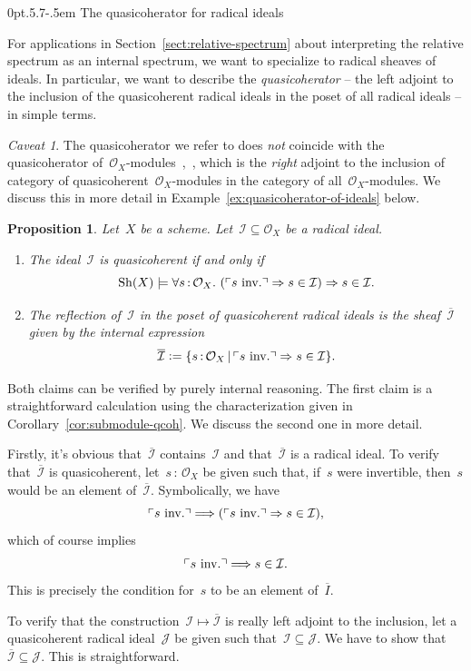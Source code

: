 \documentclass[10pt,reqno,a4paper]{amsbook}
\makeatletter
\theoremstyle{definition}
\theoremstyle{plain}
\newtheorem{prop}[defn]{Proposition}
\theoremstyle{remark}
\newtheorem{caveat}[defn]{Caveat}
\renewcommand{\O}{\mathcal{O}}
\newcommand{\I}{\mathcal{I}}
\newcommand{\J}{\mathcal{J}}
\newcommand{\Sh}{\mathrm{Sh}}
\newcommand{\?}{\,{:}\,}
\renewcommand{\_}{\mathpunct{.}\,}
\newcommand{\speak}[1]{\ulcorner\text{\textnormal{#1}}\urcorner}
\newcommand{\inv}{inv.\@}
\newcommand{\stacksproject}[1]{\cite[{\href{https://stacks.math.columbia.edu/tag/#1}{Tag~#1}}]{stacks-project}}
\newcommand{\defeq}{\vcentcolon=}
\renewenvironment{proof}[1][\proofname]{\par
  \pushQED{\qed}%
  \normalfont \topsep6\p@\@plus6\p@\relax
  \trivlist
  \item[\hskip\labelsep
        \itshape
    #1\@addpunct{.}]\ignorespaces
}{%
  \popQED\endtrivlist\@endpefalse
}
\def\subsection{\@startsection{subsection}{2}%
  {0pt}{.5\linespacing\@plus.7\linespacing}{-.5em}%
  {\normalfont\bfseries}}
\makeatother
\begin{document}
\subsection{The quasicoherator for radical ideals}

For applications in Section~\ref{sect:relative-spectrum} about interpreting the
relative spectrum as an internal spectrum, we want to specialize to radical
sheaves of ideals. In particular, we want to describe the \emph{quasicoherator} --
the left adjoint to the inclusion of the quasicoherent radical ideals in the
poset of all radical ideals -- in simple terms.

\begin{caveat}The quasicoherator we refer to does \emph{not} coincide with the
quasicoherator
of~$\O_X$-modules~\stacksproject{077P},~\cite{thomason-trobaugh}, which is the
\emph{right} adjoint to the inclusion of category of
quasicoherent~$\O_X$-modules in the category of all~$\O_X$-modules. We discuss
this in more detail in Example~\ref{ex:quasicoherator-of-ideals} below.
\end{caveat}

\begin{prop}\label{prop:quasicoherator-structure-sheaf}
Let~$X$ be a scheme. Let~$\I \subseteq \O_X$ be a radical ideal.
\begin{enumerate}
\item The ideal~$\I$ is quasicoherent if and only if
\[ \Sh(X) \models \forall s\?\O_X\_ (\speak{$s$ \inv} \Rightarrow s\in\I)
\Rightarrow s\in\I. \]
\item The reflection of~$\I$ in the poset of quasicoherent radical ideals is
the sheaf~$\overline{\I}$ given by the internal expression
\[ \overline{\I} \defeq \{ s\?\O_X \,|\, \speak{$s$ \inv} \Rightarrow s\in\I
\}. \]
\end{enumerate}
\end{prop}
\begin{proof}Both claims can be verified by purely internal reasoning. The
first claim is a straightforward calculation using the characterization given in
Corollary~\ref{cor:submodule-qcoh}. We discuss the second one in more detail.

Firstly, it's obvious that~$\overline{\I}$ contains~$\I$ and
that~$\overline{\I}$ is a radical ideal. To verify that~$\overline{\I}$ is
quasicoherent, let~$s\?\O_X$ be given such that, if~$s$ were invertible,
then~$s$ would be an element of~$\overline{\I}$. Symbolically, we have
\[ \speak{$s$ \inv} \Longrightarrow (\speak{$s$ \inv} \Rightarrow s\in\I), \]
which of course implies
\[ \speak{$s$ \inv} \Longrightarrow s\in\I. \]
This is precisely the condition for~$s$ to be an element of~$\overline{I}$.

To verify that the construction~$\I \mapsto \overline{\I}$ is really left
adjoint to the inclusion, let a quasicoherent radical ideal~$\J$ be given such
that~$\I \subseteq \J$. We have to show that~$\overline{\I} \subseteq \J$. This
is straightforward.
\end{proof}
\end{document}
